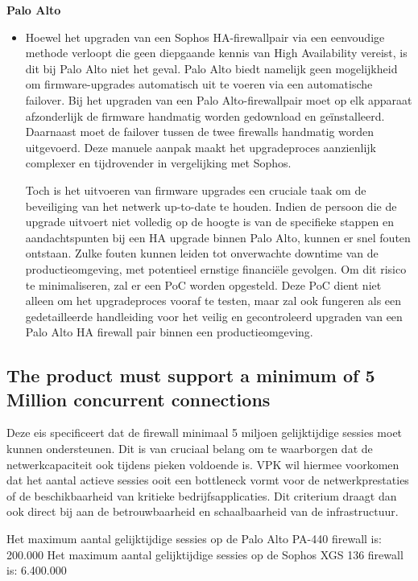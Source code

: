 \textbf{Palo Alto}
\begin{itemize}[label=\textbullet]
    \item Hoewel het upgraden van een Sophos HA-firewallpair via een eenvoudige methode verloopt die geen diepgaande kennis van High Availability vereist, is dit bij Palo Alto niet het geval. Palo Alto biedt namelijk geen mogelijkheid om firmware-upgrades automatisch uit te voeren via een automatische failover. Bij het upgraden van een Palo Alto-firewallpair moet op elk apparaat afzonderlijk de firmware handmatig worden gedownload en geïnstalleerd. Daarnaast moet de failover tussen de twee firewalls handmatig worden uitgevoerd. Deze manuele aanpak maakt het upgradeproces aanzienlijk complexer en tijdrovender in vergelijking met Sophos. 
 
    \vspace{5mm}   
    Toch is het uitvoeren van firmware upgrades een cruciale taak om de beveiliging van het netwerk up-to-date te houden. Indien de persoon die de upgrade uitvoert niet volledig op de hoogte is van de specifieke stappen en aandachtspunten bij een HA upgrade binnen Palo Alto, kunnen er snel fouten ontstaan. Zulke fouten kunnen leiden tot onverwachte downtime van de productieomgeving, met potentieel ernstige financiële gevolgen. Om dit risico te minimaliseren, zal er een PoC worden opgesteld. Deze PoC dient niet alleen om het upgradeproces vooraf te testen, maar zal ook fungeren als een gedetailleerde handleiding voor het veilig en gecontroleerd upgraden van een Palo Alto HA firewall pair binnen een productieomgeving.
\end{itemize}

\subsection{The product must support a minimum of 5 Million concurrent connections}
Deze eis specificeert dat de firewall minimaal 5 miljoen gelijktijdige sessies moet kunnen ondersteunen. Dit is van cruciaal belang om te waarborgen dat de netwerkcapaciteit ook tijdens pieken voldoende is. VPK wil hiermee voorkomen dat het aantal actieve sessies ooit een bottleneck vormt voor de netwerkprestaties of de beschikbaarheid van kritieke bedrijfsapplicaties. Dit criterium draagt dan ook direct bij aan de betrouwbaarheid en schaalbaarheid van de infrastructuur.

\vspace{5mm}
Het maximum aantal gelijktijdige sessies op de Palo Alto PA-440 firewall is: 200.000 \newline
Het maximum aantal gelijktijdige sessies op de Sophos XGS 136 firewall is: 6.400.000

